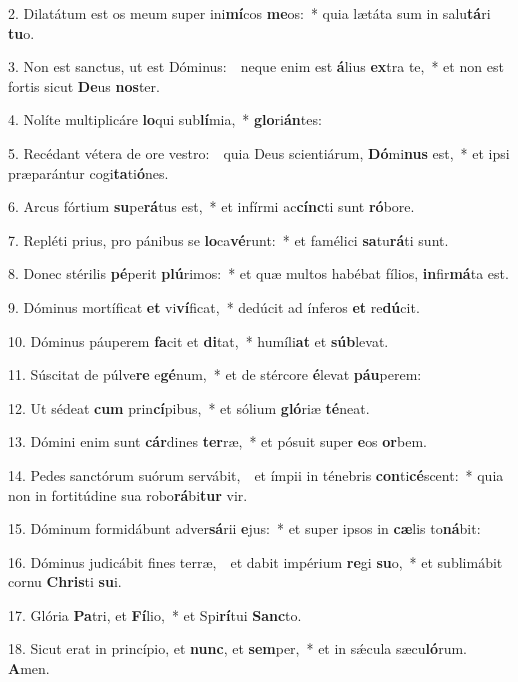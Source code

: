 
2. Dilatátum est os meum super ini\textbf{mí}cos \textbf{me}os:~* quia lætáta sum in salu\textbf{tá}ri \textbf{tu}o.

3. Non est sanctus, ut est Dóminus:~\GreDagger\ neque enim est \textbf{á}lius \textbf{ex}tra te,~* et non est fortis sicut \textbf{De}us \textbf{nos}ter.

4. Nolíte multiplicáre \textbf{lo}qui sub\textbf{lí}mia,~* \textbf{glo}ri\textbf{án}tes:

5. Recédant vétera de ore vestro:~\GreDagger\ quia Deus scientiárum, \textbf{Dó}mi\textbf{nus} est,~* et ipsi præparántur cogi\textbf{ta}ti\textbf{ó}nes.

6. Arcus fórtium \textbf{su}pe\textbf{rá}tus est,~* et infírmi ac\textbf{cínc}ti sunt \textbf{ró}bore.

7. Repléti prius, pro pánibus se \textbf{lo}ca\textbf{vé}runt:~* et famélici \textbf{sa}tu\textbf{rá}ti sunt.

8. Donec stérilis \textbf{pé}perit \textbf{plú}rimos:~* et quæ multos habébat fílios, \textbf{in}fir\textbf{má}ta est.

9. Dóminus mortíficat \textbf{et} vi\textbf{ví}ficat,~* dedúcit ad ínferos \textbf{et} re\textbf{dú}cit.

10. Dóminus páuperem \textbf{fa}cit et \textbf{di}tat,~* humíli\textbf{at} et \textbf{súb}levat.

11. Súscitat de púlve\textbf{re} e\textbf{gé}num,~* et de stércore \textbf{é}levat \textbf{páu}perem:

12. Ut sédeat \textbf{cum} prin\textbf{cí}pibus,~* et sólium \textbf{gló}riæ \textbf{té}neat.

13. Dómini enim sunt \textbf{cár}dines \textbf{ter}ræ,~* et pósuit super \textbf{e}os \textbf{or}bem.

14. Pedes sanctórum suórum servábit,~\GreDagger\ et ímpii in ténebris \textbf{con}ti\textbf{cé}scent:~* quia non in fortitúdine sua robo\textbf{rá}bi\textbf{tur} vir.

15. Dóminum formidábunt adver\textbf{sá}rii \textbf{e}jus:~* et super ipsos in \textbf{cæ}lis to\textbf{ná}bit:

16. Dóminus judicábit fines terræ,~\GreDagger\ et dabit impérium \textbf{re}gi \textbf{su}o,~* et sublimábit cornu \textbf{Chris}ti \textbf{su}i.

17. Glória \textbf{Pa}tri, et \textbf{Fí}lio,~* et Spi\textbf{rí}tui \textbf{Sanc}to.

18. Sicut erat in princípio, et \textbf{nunc}, et \textbf{sem}per,~* et in s\'{\ae}cula sæcu\textbf{ló}rum. \textbf{A}men.